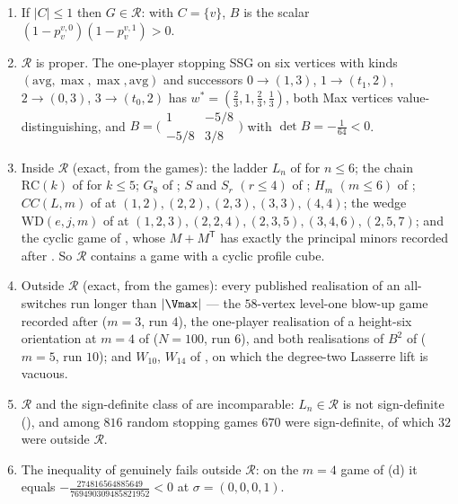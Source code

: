 \begin{proposition}\label{vr:content}
\begin{enumerate}[label=(\alph*),leftmargin=2.2em]
\item If $|C|\le1$ then $G\in\mathcal R$: with $C=\{v\}$, $B$ is the scalar
      $(1-p^{v,0}_v)(1-p^{v,1}_v)>0$.
\item $\mathcal R$ is proper. The one-player stopping SSG on six vertices
      with kinds $(\mathrm{avg},\max,\max,\mathrm{avg})$ and successors
      $0\to(1,3)$, $1\to(t_1,2)$, $2\to(0,3)$, $3\to(t_0,2)$ has
      $w^{\ast}=(\tfrac23,1,\tfrac23,\tfrac13)$, both Max vertices
      value-distinguishing, and
      $B=\bigl(\begin{smallmatrix}1&-5/8\\-5/8&3/8\end{smallmatrix}\bigr)$
      with $\det B=-\tfrac1{64}<0$.
\item Inside $\mathcal R$ (exact, from the games): the ladder $L_n$ of
       for $n\le6$; the chain $\mathrm{RC}(k)$ of
       for $k\le5$; $G_8$ of
      ; $S$ and $S_r$ $(r\le4)$ of
      ; $H_m$ $(m\le6)$ of
      ; $CC(L,m)$ of  at
      $(1,2),(2,2),(2,3),(3,3),(4,4)$; the wedge $\mathrm{WD}(e,j,m)$ of
       at $(1,2,3),(2,2,4),(2,3,5),(3,4,6),(2,5,7)$; and the
      cyclic game of , whose $M+M^{\mathsf T}$ has
      exactly the principal minors recorded after .
      So $\mathcal R$ contains a game with a cyclic profile cube.
\item Outside $\mathcal R$ (exact, from the games): every published
      realisation of an all-switches run longer than $|\Vmax|$ --- the
      $58$-vertex level-one blow-up game recorded after
       ($m=3$, run $4$), the
      one-player realisation of a height-six orientation at $m=4$ of
       ($N=100$, run $6$), and both realisations of
      $B^{2}$ of  ($m=5$, run $10$); and $W_{10}$,
      $W_{14}$ of , on which the degree-two
      Lasserre lift is vacuous.
\item $\mathcal R$ and the sign-definite class of  are
      incomparable: $L_n\in\mathcal R$ is not sign-definite
      (), and among $816$ random stopping games $670$
      were sign-definite, of which $32$ were outside $\mathcal R$.
\item The inequality of  genuinely fails outside
      $\mathcal R$: on the $m=4$ game of (d) it equals
      $-\tfrac{274816564885649}{769490309485821952}<0$ at
      $\sigma=(0,0,0,1)$.
\end{enumerate}
\end{proposition}

